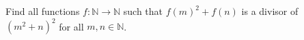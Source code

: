 Find all functions $f\colon\mathbb{N} \rightarrow \mathbb{N}$ such that $f(m)^2+f(n)$ is a
divisor of $(m^2+n)^2$ for all $m,n \in \mathbb{N}$.